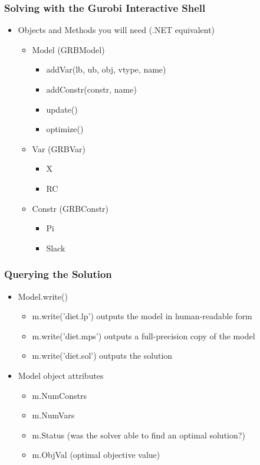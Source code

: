 \documentclass[12pt,handout]{beamer}
\begin{document}
\begin{frame}
\frametitle{Solving with the Gurobi Interactive Shell}
\begin{itemize}
\item Objects and Methods you will need (.NET equivalent)
    \begin{itemize}
    \item Model (GRBModel)
        \begin{itemize}
        \item addVar(lb, ub, obj, vtype, name)
        \item addConstr(constr, name)
        \item update()
        \item optimize()
        \end{itemize}
    \item Var (GRBVar)
        \begin{itemize}
        \item X
        \item RC
        \end{itemize}
    \item Constr (GRBConstr)
        \begin{itemize}
        \item Pi
        \item Slack
        \end{itemize}
    \end{itemize}
\end{itemize}
\end{frame}

\begin{frame}
\frametitle{Querying the Solution}
\begin{itemize}
\item Model.write()
    \begin{itemize}
    \item m.write('diet.lp') outputs the model in human-readable form
    \item m.write('diet.mps') outputs a full-precision copy of the model
    \item m.write('diet.sol') outputs the solution
    \end{itemize}
\item Model object attributes
    \begin{itemize}
    \item m.NumConstrs
    \item m.NumVars
    \item m.Status (was the solver able to find an optimal solution?)
    \item m.ObjVal (optimal objective value)
    \end{itemize}
\end{itemize}
\end{frame}
\end{document}
